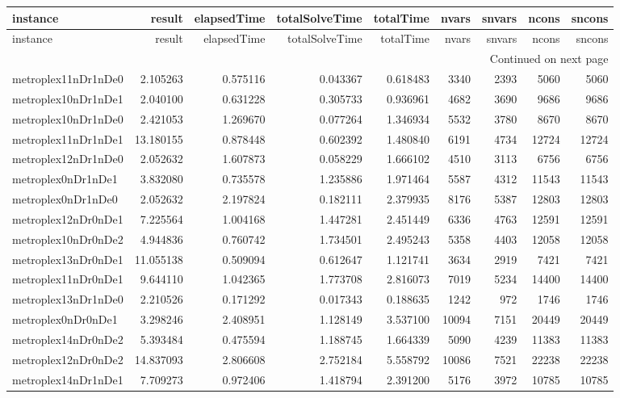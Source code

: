 \begin{longtable}{|l|r|r|r|r|r|r|r|r|}
\toprule
instance & result & elapsedTime & totalSolveTime & totalTime & nvars & snvars & ncons & sncons \\
\midrule
\endfirsthead
\toprule
instance & result & elapsedTime & totalSolveTime & totalTime & nvars & snvars & ncons & sncons \\
\midrule
\endhead
\midrule
\multicolumn{9}{r}{Continued on next page} \\
\midrule
\endfoot
\bottomrule
\endlastfoot
metroplex11nDr1nDe0 & 2.105263 & 0.575116 & 0.043367 & 0.618483 & 3340 & 2393 & 5060 & 5060 \\
metroplex10nDr1nDe1 & 2.040100 & 0.631228 & 0.305733 & 0.936961 & 4682 & 3690 & 9686 & 9686 \\
metroplex10nDr1nDe0 & 2.421053 & 1.269670 & 0.077264 & 1.346934 & 5532 & 3780 & 8670 & 8670 \\
metroplex11nDr1nDe1 & 13.180155 & 0.878448 & 0.602392 & 1.480840 & 6191 & 4734 & 12724 & 12724 \\
metroplex12nDr1nDe0 & 2.052632 & 1.607873 & 0.058229 & 1.666102 & 4510 & 3113 & 6756 & 6756 \\
metroplex0nDr1nDe1 & 3.832080 & 0.735578 & 1.235886 & 1.971464 & 5587 & 4312 & 11543 & 11543 \\
metroplex0nDr1nDe0 & 2.052632 & 2.197824 & 0.182111 & 2.379935 & 8176 & 5387 & 12803 & 12803 \\
metroplex12nDr0nDe1 & 7.225564 & 1.004168 & 1.447281 & 2.451449 & 6336 & 4763 & 12591 & 12591 \\
metroplex10nDr0nDe2 & 4.944836 & 0.760742 & 1.734501 & 2.495243 & 5358 & 4403 & 12058 & 12058 \\
metroplex13nDr0nDe1 & 11.055138 & 0.509094 & 0.612647 & 1.121741 & 3634 & 2919 & 7421 & 7421 \\
metroplex11nDr0nDe1 & 9.644110 & 1.042365 & 1.773708 & 2.816073 & 7019 & 5234 & 14400 & 14400 \\
metroplex13nDr1nDe0 & 2.210526 & 0.171292 & 0.017343 & 0.188635 & 1242 & 972 & 1746 & 1746 \\
metroplex0nDr0nDe1 & 3.298246 & 2.408951 & 1.128149 & 3.537100 & 10094 & 7151 & 20449 & 20449 \\
metroplex14nDr0nDe2 & 5.393484 & 0.475594 & 1.188745 & 1.664339 & 5090 & 4239 & 11383 & 11383 \\
metroplex12nDr0nDe2 & 14.837093 & 2.806608 & 2.752184 & 5.558792 & 10086 & 7521 & 22238 & 22238 \\
metroplex14nDr1nDe1 & 7.709273 & 0.972406 & 1.418794 & 2.391200 & 5176 & 3972 & 10785 & 10785 \\

\end{longtable}
